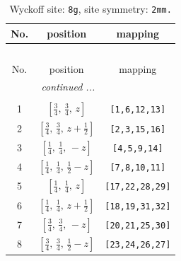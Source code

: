 \documentclass[fleqn,8pt]{jsarticle}
\begin{document}
\begin{longtable}{ccc}
\caption{Wyckoff site: {\tt 8g}, site symmetry: {\tt 2mm.}}
 \\
 \hline \hline
No. & position & mapping \\ \hline \endfirsthead

\multicolumn{2}{l}{\tablename\ \thetable{}} \\
 \hline \hline
No. & position & mapping \\ \hline \endhead

 \hline \hline
\multicolumn{2}{r}{\footnotesize\it continued ...} \\ \endfoot

 \hline \hline
\multicolumn{2}{r}{} \\ \endlastfoot

1 & $\left[ \frac{3}{4},\, \frac{3}{4},\, z \right]$ & {\tt [1,6,12,13]} \\ \hline
2 & $\left[ \frac{3}{4},\, \frac{3}{4},\, z + \frac{1}{2} \right]$ & {\tt [2,3,15,16]} \\ \hline
3 & $\left[ \frac{1}{4},\, \frac{1}{4},\, - z \right]$ & {\tt [4,5,9,14]} \\ \hline
4 & $\left[ \frac{1}{4},\, \frac{1}{4},\, \frac{1}{2} - z \right]$ & {\tt [7,8,10,11]} \\ \hline
5 & $\left[ \frac{1}{4},\, \frac{1}{4},\, z \right]$ & {\tt [17,22,28,29]} \\ \hline
6 & $\left[ \frac{1}{4},\, \frac{1}{4},\, z + \frac{1}{2} \right]$ & {\tt [18,19,31,32]} \\ \hline
7 & $\left[ \frac{3}{4},\, \frac{3}{4},\, - z \right]$ & {\tt [20,21,25,30]} \\ \hline
8 & $\left[ \frac{3}{4},\, \frac{3}{4},\, \frac{1}{2} - z \right]$ & {\tt [23,24,26,27]} \\
\end{longtable}
\renewcommand{\arraystretch}{1.2}
\end{document}
